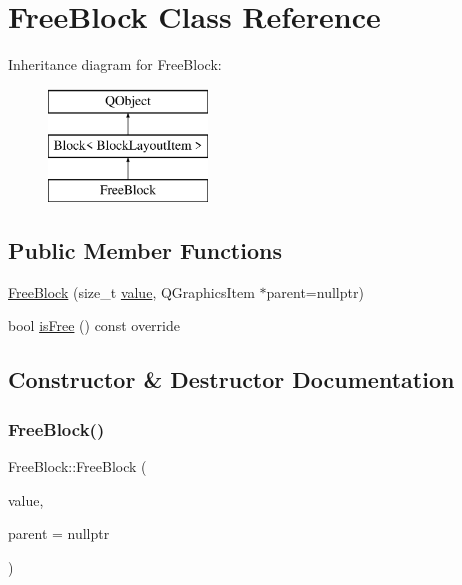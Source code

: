 \hypertarget{class_free_block}{}\section{Free\+Block Class Reference}
\label{class_free_block}
Inheritance diagram for Free\+Block\+:\begin{figure}[H]
\begin{center}
\leavevmode
\includegraphics[height=3.000000cm]{class_free_block}
\end{center}
\end{figure}
\subsection*{Public Member Functions}
\begin{DoxyCompactItemize}
\item 
\mbox{\hyperlink{class_free_block_aa23ff8e21dde64908f9c6c01bf8e6923}{Free\+Block}} (size\+\_\+t \mbox{\hyperlink{class_block_ab0b547f273f8d5e4e783ccedaf13ef26}{value}}, Q\+Graphics\+Item $\ast$parent=nullptr)
\item 
bool \mbox{\hyperlink{class_free_block_a76d3f40934d42c566095ee2f1386eac5}{is\+Free}} () const override
\end{DoxyCompactItemize}


\subsection{Constructor \& Destructor Documentation}
\mbox{\label{class_free_block_aa23ff8e21dde64908f9c6c01bf8e6923}} 
\subsubsection{\texorpdfstring{FreeBlock()}{FreeBlock()}}
{\footnotesize\ttfamily Free\+Block\+::\+Free\+Block (\begin{DoxyParamCaption}\item[{size\+\_\+t}]{value,  }\item[{Q\+Graphics\+Item $\ast$}]{parent = {\ttfamily nullptr} }\end{DoxyParamCaption})\hspace{0.3cm}{\ttfamily [inline]}}


